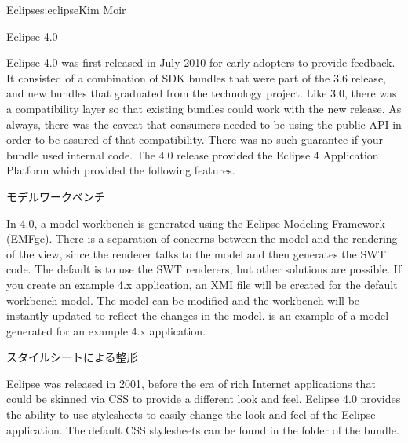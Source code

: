 \begin{aosachapter}{Eclipse}{s:eclipse}{Kim Moir}
\begin{aosasect1}{Eclipse 4.0}

Eclipse 4.0 was first released in July 2010 for early adopters to
provide feedback. It consisted of a combination of SDK bundles that
were part of the 3.6 release, and new bundles that graduated from the
technology project.  Like 3.0, there was a compatibility layer so that
existing bundles could work with the new release. As always, there was
the caveat that consumers needed to be using the public API in order
to be assured of that compatibility.  There was no such guarantee if
your bundle used internal code. The 4.0 release provided the Eclipse 4
Application Platform which provided the following features.

\begin{aosasect2}{モデルワークベンチ}

In 4.0, a model workbench is generated using the Eclipse Modeling
Framework (EMFgc). There is a separation of concerns between the model
and the rendering of the view, since the renderer talks to the model
and then generates the SWT code. The default is to use the SWT
renderers, but other solutions are possible.  If you create an example
4.x application, an XMI file will be created for the default workbench
model. The model can be modified and the workbench will be instantly
updated to reflect the changes in the model. 
is an example of a model generated for an example 4.x application.


\end{aosasect2}

\begin{aosasect2}{スタイルシートによる整形}

Eclipse was released in 2001, before the era of rich Internet
applications that could be skinned via CSS to provide a different look
and feel. Eclipse 4.0 provides the ability to use stylesheets to
easily change the look and feel of the Eclipse application. The
default CSS stylesheets can be found in the  folder of the
 bundle.


\end{aosasect2}
\end{aosasect1}
\end{aosachapter}
